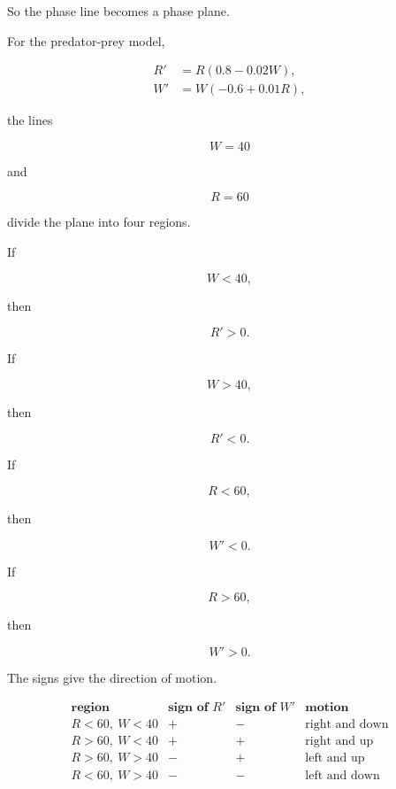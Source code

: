 So the phase line becomes a phase plane.

For the predator-prey model,

\[
\begin{aligned}
R'&=R(0.8-0.02W),\\
W'&=W(-0.6+0.01R),
\end{aligned}
\]

the lines

\[
W=40
\]

and

\[
R=60
\]

divide the plane into four regions.

If

\[
W<40,
\]

then

\[
R'>0.
\]

If

\[
W>40,
\]

then

\[
R'<0.
\]

If

\[
R<60,
\]

then

\[
W'<0.
\]

If

\[
R>60,
\]

then

\[
W'>0.
\]

The signs give the direction of motion.

\[
\begin{array}{c|c|c|c}
\textbf{region} & \textbf{sign of \(R'\)} & \textbf{sign of \(W'\)} & \textbf{motion} \\ \hline
R<60,\ W<40 & + & - & \text{right and down} \\
R>60,\ W<40 & + & + & \text{right and up} \\
R>60,\ W>40 & - & + & \text{left and up} \\
R<60,\ W>40 & - & - & \text{left and down}
\end{array}
\]

